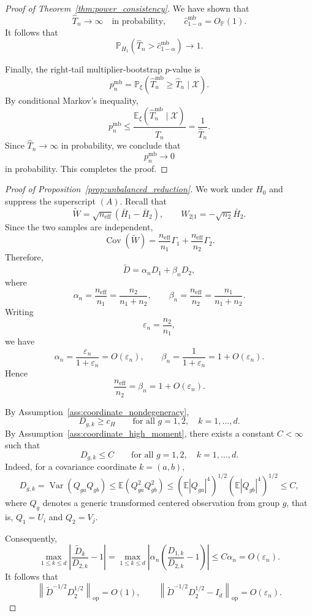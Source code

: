 \documentclass[
  12pt]{article}
\theoremstyle{plain}
\theoremstyle{definition}
\theoremstyle{remark}
\begin{document}
\begin{proof}[Proof of Theorem~\ref{thm:power_consistency}]
We have shown that
\[
\widehat T_n\to\infty
\quad\text{in probability},
\qquad
\widehat c_{1-\alpha}^{\mathrm{mb}}=O_{\mathbb P}(1).
\]
It follows that
\[
\mathbb P_{H_1}
\left(
\widehat T_n>\widehat c_{1-\alpha}^{\mathrm{mb}}
\right)
\to1.
\]

Finally, the right-tail multiplier-bootstrap \(p\)-value is
\[
p_n^{\mathrm{mb}}
=
\mathbb P_\xi
\left(
\widehat T_n^{\mathrm{mb}}\ge \widehat T_n
\mid\mathcal X
\right).
\]
By conditional Markov's inequality,
\[
p_n^{\mathrm{mb}}
\le
\frac{
\mathbb E_\xi(\widehat T_n^{\mathrm{mb}}\mid\mathcal X)
}{
\widehat T_n
}
=
\frac1{\widehat T_n}.
\]
Since \(\widehat T_n\to\infty\) in probability, we conclude that
\[
p_n^{\mathrm{mb}}\to0
\]
in probability.  This completes the proof.
\end{proof}

\begin{proof}[Proof of Proposition~\ref{prop:unbalanced_reduction}]
We work under \(H_0\) and suppress the superscript \((A)\).  Recall that
\[
\widetilde W
=
\sqrt{n_{\mathrm{eff}}}(\bar H_1-\bar H_2),
\qquad
W_{2|1}
=
-\sqrt{n_2}\bar H_2.
\]
Since the two samples are independent,
\[
\operatorname{Cov}(\widetilde W)
=
\frac{n_{\mathrm{eff}}}{n_1}\Gamma_1
+
\frac{n_{\mathrm{eff}}}{n_2}\Gamma_2.
\]
Therefore,
\[
\widetilde D
=
\alpha_nD_1+\beta_nD_2,
\]
where
\[
\alpha_n
=
\frac{n_{\mathrm{eff}}}{n_1}
=
\frac{n_2}{n_1+n_2},
\qquad
\beta_n
=
\frac{n_{\mathrm{eff}}}{n_2}
=
\frac{n_1}{n_1+n_2}.
\]
Writing
\[
\varepsilon_n=\frac{n_2}{n_1},
\]
we have
\[
\alpha_n=\frac{\varepsilon_n}{1+\varepsilon_n}=O(\varepsilon_n),
\qquad
\beta_n=\frac1{1+\varepsilon_n}=1+O(\varepsilon_n).
\]
Hence
\[
\frac{n_{\mathrm{eff}}}{n_2}=\beta_n=1+O(\varepsilon_n).
\]

By Assumption~\ref{ass:coordinate_nondegeneracy},
\[
D_{g,k}\ge c_H
\qquad
\text{for all }g=1,2,\quad k=1,\ldots,d.
\]
By Assumption~\ref{ass:coordinate_high_moment}, there exists a constant
\(C<\infty\) such that
\[
D_{g,k}\le C
\qquad
\text{for all }g=1,2,\quad k=1,\ldots,d.
\]
Indeed, for a covariance coordinate \(k=(a,b)\),
\[
D_{g,k}
=
\operatorname{Var}(Q_{ga}Q_{gb})
\le
\mathbb E(Q_{ga}^2Q_{gb}^2)
\le
\left(\mathbb E|Q_{ga}|^4\right)^{1/2}
\left(\mathbb E|Q_{gb}|^4\right)^{1/2}
\le C,
\]
where \(Q_g\) denotes a generic transformed centered observation from group
\(g\), that is, \(Q_1=U_i\) and \(Q_2=V_j\).

Consequently,
\[
\max_{1\le k\le d}
\left|
\frac{\widetilde D_k}{D_{2,k}}-1
\right|
=
\max_{1\le k\le d}
\left|
\alpha_n
\left(
\frac{D_{1,k}}{D_{2,k}}-1
\right)
\right|
\le
C\alpha_n
=
O(\varepsilon_n).
\]
It follows that
\[
\left\|
\widetilde D^{-1/2}D_2^{1/2}
\right\|_{\mathrm{op}}
=
O(1),
\qquad
\left\|
\widetilde D^{-1/2}D_2^{1/2}-I_d
\right\|_{\mathrm{op}}
=
O(\varepsilon_n).
\]


\end{proof}
\end{document}
